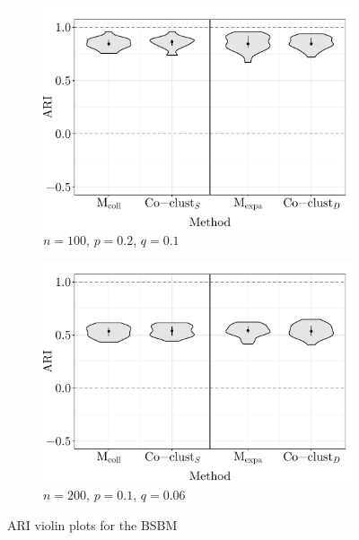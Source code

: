 \begin{figure}[H]
	\begin{subfigure}{.49\textwidth}
		\centering
		\includegraphics[scale=0.4,draft=false]{../../results/bipartite/bipartite1.pdf}
		\caption{$n=100$, $p=0.2$, $q=0.1$}
	\end{subfigure}
	\begin{subfigure}{.49\textwidth}
		\centering
		\includegraphics[scale=0.4,draft=false]{../../results/bipartite/bipartite2.pdf}
		\caption{$n=200$, $p=0.1$, $q=0.06$}
	\end{subfigure}
	\caption{ARI violin plots for the BSBM}
	\label{fig:bipartite}
\end{figure}











